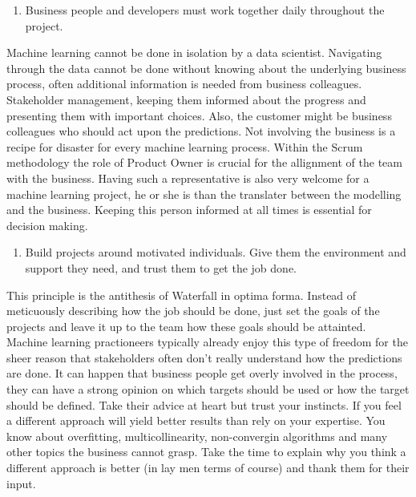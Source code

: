 \documentclass[]{book}
\providecommand{\tightlist}{%
  \setlength{\itemsep}{0pt}\setlength{\parskip}{0pt}}
\begin{document}
\begin{enumerate}
\def\labelenumi{\arabic{enumi})}
\setcounter{enumi}{3}
\tightlist
\item
  Business people and developers must work together daily throughout the project.
\end{enumerate}

Machine learning cannot be done in isolation by a data scientist. Navigating through the data cannot be done without knowing about the underlying business process, often additional information is needed from business colleagues. Stakeholder management, keeping them informed about the progress and presenting them with important choices. Also, the customer might be business colleagues who should act upon the predictions. Not involving the business is a recipe for disaster for every machine learning process. Within the Scrum methodology the role of Product Owner is crucial for the allignment of the team with the business. Having such a representative is also very welcome for a machine learning project, he or she is than the translater between the modelling and the business. Keeping this person informed at all times is essential for decision making.

\begin{enumerate}
\def\labelenumi{\arabic{enumi})}
\setcounter{enumi}{4}
\tightlist
\item
  Build projects around motivated individuals. Give them the environment and support they need, and trust them to get the job done.
\end{enumerate}

This principle is the antithesis of Waterfall in optima forma. Instead of meticuously describing how the job should be done, just set the goals of the projects and leave it up to the team how these goals should be attainted. Machine learning practioneers typically already enjoy this type of freedom for the sheer reason that stakeholders often don't really understand how the predictions are done. It can happen that business people get overly involved in the process, they can have a strong opinion on which targets should be used or how the target should be defined. Take their advice at heart but trust your instincts. If you feel a different approach will yield better results than rely on your expertise. You know about overfitting, multicollinearity, non-convergin algorithms and many other topics the business cannot grasp. Take the time to explain why you think a different approach is better (in lay men terms of course) and thank them for their input.
\end{document}
